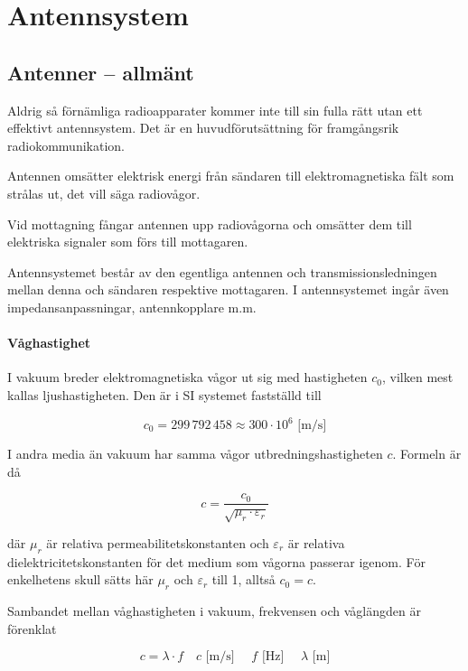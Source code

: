 \chapter{Antennsystem}

\section{Antenner -- allmänt}

Aldrig så förnämliga radioapparater kommer inte till sin fulla rätt utan ett
effektivt antennsystem.
Det är en huvudförutsättning för framgångsrik radiokommunikation.

Antennen omsätter elektrisk energi från sändaren till elektromagnetiska fält
som strålas ut, det vill säga radiovågor.

Vid mottagning fångar antennen upp radiovågorna och omsätter dem till
elektriska signaler som förs till mottagaren.

Antennsystemet består av den egentliga antennen och transmissionsledningen
mellan denna och sändaren respektive mottagaren.
I antennsystemet ingår även impedansanpassningar, antennkopplare m.m.

\subsubsection{Våghastighet}
\label{ljushastigheten}

I vakuum breder elektromagnetiska vågor ut sig med hastigheten \(c_0\), vilken
mest kallas ljushastigheten.
Den är i SI systemet \cite{SIbrochure8} fastställd till

\[c_0 = 299\,792\,458 \approx 300 \cdot 10^6 \text{ [m/s]}\]

I andra media än vakuum har samma vågor utbredningshastigheten \(c\).
Formeln är då

\[c = \frac{c_0}{\sqrt{\mu_r \cdot \varepsilon_r}}\]

där \(\mu_r\) är relativa permeabilitetskonstanten och \(\varepsilon_r\) är
relativa dielektricitetskonstanten för det medium som vågorna passerar igenom.
För enkelhetens skull sätts här \(\mu_r\) och \(\varepsilon_r\) till 1,
alltså \(c_0 = c\).

Sambandet mellan våghastigheten i vakuum, frekvensen och våglängden är förenklat

\[ c = \lambda \cdot f \quad c\text{ [m/s] }\quad f\text{ [Hz] } \quad \lambda\text{ [m]}\]

